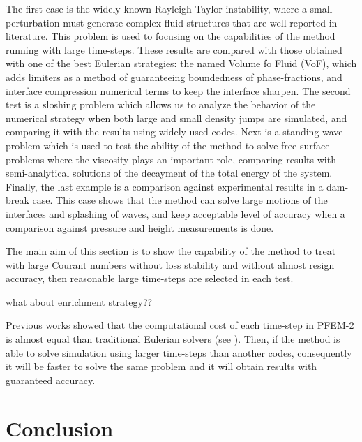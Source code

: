 \documentclass[review]{elsarticle}
\begin{document}
The first case is the widely known Rayleigh-Taylor instability, where a small perturbation must generate complex fluid structures that are well reported in literature.
This problem is used to focusing on the capabilities of the method running with large time-steps. These results are compared with those obtained with one of the best Eulerian strategies: the named Volume fo Fluid (VoF), which adds limiters as a method of guaranteeing boundedness of phase-fractions, and interface compression numerical terms to keep the interface sharpen.
The second test is a sloshing problem which allows us to analyze the behavior of the numerical strategy when both large and small density jumps are simulated, and comparing it with the results using widely used codes. Next is a standing wave problem which is used to test the ability of the method to solve free-surface problems where the viscosity plays an important role, comparing results with semi-analytical solutions of the decayment of the total energy of the system.
Finally, the last example is a comparison against experimental results in a dam-break case.
This case shows that the method can solve large motions of the interfaces and splashing of waves, and keep acceptable level of accuracy when a comparison against pressure and height measurements is done.

The main aim of this section is to show the capability of the method to treat with large Courant numbers without loss stability and without almost resign accuracy, then reasonable large time-steps are selected in each test.

what about enrichment strategy??

Previous works showed that the computational cost of each time-step in PFEM-2 is almost equal than traditional Eulerian solvers (see \cite{Idelsohn12b}\cite{Gimenez14}). Then, if the method is able to solve simulation using larger time-steps than another codes, consequently it will be faster to solve the same problem and it will obtain results with guaranteed accuracy.





% 


\section{Conclusion}
\end{document}
